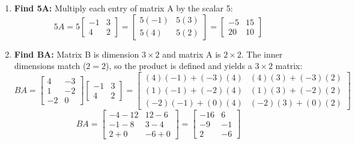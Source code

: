 \documentclass[11pt,letterpaper]{article}
\begin{document}
\begin{enumerate}
    \item[(a)] \textbf{Find 5A:}
    Multiply each entry of matrix A by the scalar 5:
    $$5A = 5 \begin{bmatrix} -1 & 3 \\ 4 & 2 \end{bmatrix} = \begin{bmatrix} 5(-1) & 5(3) \\ 5(4) & 5(2) \end{bmatrix} = \begin{bmatrix} -5 & 15 \\ 20 & 10 \end{bmatrix}$$

    \item[(b)] \textbf{Find BA:}
    Matrix B is dimension $3 \times 2$ and matrix A is $2 \times 2$. The inner dimensions match ($2 = 2$), so the product is defined and yields a $3 \times 2$ matrix:
    $$BA = \begin{bmatrix} 4 & -3 \\ 1 & -2 \\ -2 & 0 \end{bmatrix} \begin{bmatrix} -1 & 3 \\ 4 & 2 \end{bmatrix} = \begin{bmatrix} (4)(-1) + (-3)(4) & (4)(3) + (-3)(2) \\ (1)(-1) + (-2)(4) & (1)(3) + (-2)(2) \\ (-2)(-1) + (0)(4) & (-2)(3) + (0)(2) \end{bmatrix}$$
    $$BA = \begin{bmatrix} -4 - 12 & 12 - 6 \\ -1 - 8 & 3 - 4 \\ 2 + 0 & -6 + 0 \end{bmatrix} = \begin{bmatrix} -16 & 6 \\ -9 & -1 \\ 2 & -6 \end{bmatrix}$$


\end{enumerate}
\end{document}
